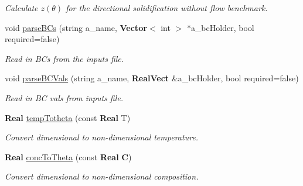 \begin{DoxyCompactItemize}
\begin{DoxyCompactList}\small\item\em Calculate $ z(\theta) $ for the directional solidification without flow benchmark. \end{DoxyCompactList}\item 
void \hyperlink{class_mushy_layer_params_a497dc7bd7c29819bd697d255af8de3d6}{parse\+B\+Cs} (string a\+\_\+name, \textbf{ Vector}$<$ int $>$ $\ast$a\+\_\+bc\+Holder, bool required=false)
\begin{DoxyCompactList}\small\item\em Read in B\+Cs from the inputs file. \end{DoxyCompactList}\item 
\mbox{\label{class_mushy_layer_params_a534c1e576d710007d5bb7ad8354cd495}} 
void \hyperlink{class_mushy_layer_params_a534c1e576d710007d5bb7ad8354cd495}{parse\+B\+C\+Vals} (string a\+\_\+name, \textbf{ Real\+Vect} \&a\+\_\+bc\+Holder, bool required=false)
\begin{DoxyCompactList}\small\item\em Read in BC vals from inputs file. \end{DoxyCompactList}\item 
\mbox{\label{class_mushy_layer_params_a096f90c939815ffda795d7c81a0a25d3}} 
\textbf{ Real} \hyperlink{class_mushy_layer_params_a096f90c939815ffda795d7c81a0a25d3}{temp\+Totheta} (const \textbf{ Real} T)
\begin{DoxyCompactList}\small\item\em Convert dimensional to non-\/dimensional temperature. \end{DoxyCompactList}\item 
\mbox{\label{class_mushy_layer_params_ab9cc390b6c5db5c4d6f083c0f2f14503}} 
\textbf{ Real} \hyperlink{class_mushy_layer_params_ab9cc390b6c5db5c4d6f083c0f2f14503}{conc\+To\+Theta} (const \textbf{ Real} \textbf{ C})
\begin{DoxyCompactList}\small\item\em Convert dimensional to non-\/dimensional composition. \end{DoxyCompactList}\item 
\mbox{\label{class_mushy_layer_params_ae036d6b6250a955546827dd17b9f967c}} 

\end{DoxyCompactItemize}
